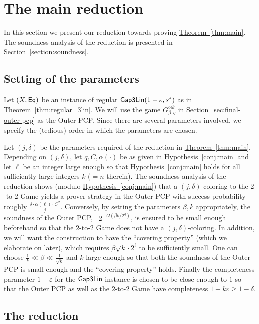 \documentclass[11pt]{article}
\numberwithin{equation}{section}
\theoremstyle{definition}
\theoremstyle{plain}
\newcommand{\expref}[2]{\hyperref[#2]{#1~\ref{#2}}}
\newcommand\eps{\varepsilon}
\renewcommand\geq{\geqslant}
\begin{document}
\section{The main reduction}\label{section:construction}
In this section we present our reduction towards proving \expref{Theorem}{thm:main}. The soundness analysis of the reduction is
presented in \expref{Section}{section:soundness}.

\subsection{Setting of the parameters}

Let $(X, {\sf Eq})$ be an instance of regular  ${\sf Gap3Lin}(1-\eps, s^*)$ as in \expref{Theorem}{thm:regular_3lin}. We will use the
game $G_{\beta, q}^{\otimes k}$ in \expref{Section}{sec:final-outer-pcp} as the Outer PCP. Since there are several parameters involved, we specify the (tedious) order in which the parameters are chosen.

Let $(j,\delta)$ be the parameters required of the reduction in \expref{Theorem}{thm:main}. Depending on $(j,\delta)$, let $q, C, \alpha(\cdot)$ be as given in
\expref{Hypothesis}{conj:main} and let $\ell$ be an integer large enough so that \expref{Hypothesis}{conj:main} holds for all sufficiently large integers $k$ ($= n$ therein). The soundness
analysis of the reduction shows (modulo \expref{Hypothesis}{conj:main}) that a $(j,\delta)$-coloring to the $2$-to-$2$ Game yields a prover strategy in the
Outer PCP with success probability roughly $\frac{\delta\cdot \alpha(\ell) \cdot C^2}{j}$. Conversely, by setting the parameters $\beta, k$ appropriately, the
 soundness of the Outer PCP, ~$2^{-\Omega(\beta k/2^q)}$, is ensured to be small enough beforehand so that the $2$-to-$2$ Game does not have a $(j,\delta)$-coloring.
In addition, we will want the construction to have the ``covering property'' (which we elaborate on
later), which requires $\beta  \sqrt{k}\cdot 2^\ell$ to be sufficiently small. One can choose $\frac{1}{k} \ll \beta \ll
\frac{1}{\sqrt{k}}$ and $k$ large enough so that both the soundness of the Outer PCP is small enough and the ``covering property'' holds.
 Finally the completeness parameter $1-\eps$ for the ${\sf Gap3Lin}$
instance is chosen to be close enough to $1$ so that the Outer PCP as well as the $2$-to-$2$ Game have completeness $1-k\eps \geq 1-\delta$.




\subsection{The reduction}
\end{document}
